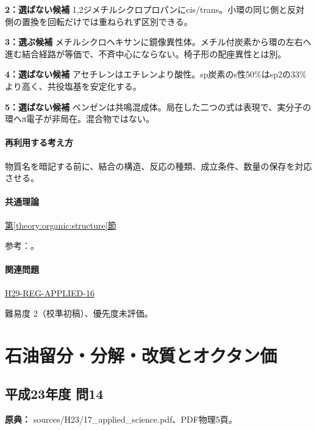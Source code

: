 \noindent\textbf{2：選ばない候補} 1,2ジメチルシクロプロパンにcis/trans。小環の同じ側と反対側の置換を回転だけでは重ねられず区別できる。\par

\noindent\textbf{3：選ぶ候補} メチルシクロヘキサンに鏡像異性体。メチル付炭素から環の左右へ進む結合経路が等価で、不斉中心にならない。椅子形の配座異性とは別。\par

\noindent\textbf{4：選ばない候補} アセチレンはエチレンより酸性。sp炭素のs性50\%はsp2の33\%より高く、共役塩基を安定化する。\par

\noindent\textbf{5：選ばない候補} ベンゼンは共鳴混成体。局在した二つの式は表現で、実分子の環へπ電子が非局在。混合物ではない。\par

\paragraph{再利用する考え方} 物質名を暗記する前に、結合の構造、反応の種類、成立条件、数量の保存を対応させる。

\paragraph{共通理論} \hyperref[theory:organic:structure]{第\ref*{theory:organic:structure}節}

\par 参考：\cite{organic_chirality,organic_benzene}。

\paragraph{関連問題} \hyperref[q:h29-reg-applied-16]{H29-REG-APPLIED-16}

\par 難易度 2（校準初稿）、優先度未評価。

\section{石油留分・分解・改質とオクタン価}

\subsection{平成23年度 問14}
\label{q:h23-reg-applied-14}

\noindent\textbf{原典：} sources/H23/17\_applied\_science.pdf、PDF物理5頁。

